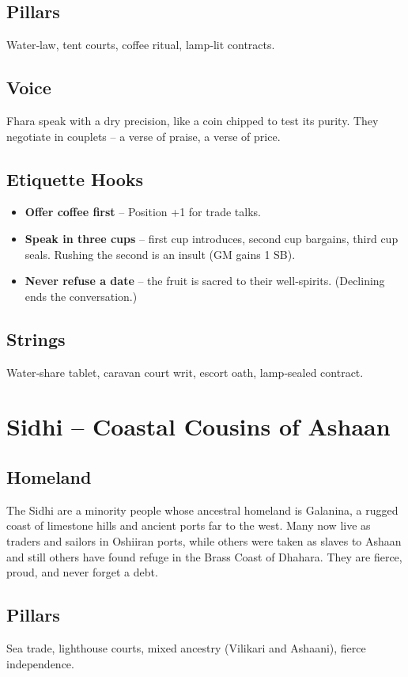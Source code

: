 \documentclass[11pt]{book}
\begin{document}
\subsection*{Pillars}
Water‑law, tent courts, coffee ritual, lamp‑lit contracts.

\subsection*{Voice}
Fhara speak with a dry precision, like a coin chipped to test its purity. They negotiate in couplets -- a verse of praise, a verse of price.

\subsection*{Etiquette Hooks}
\begin{itemize}
    \item \textbf{Offer coffee first} -- Position +1 for trade talks.
    \item \textbf{Speak in three cups} -- first cup introduces, second cup bargains, third cup seals. Rushing the second is an insult (GM gains 1 SB).
    \item \textbf{Never refuse a date} -- the fruit is sacred to their well‑spirits. (Declining ends the conversation.)
\end{itemize}

\subsection*{Strings}
Water‑share tablet, caravan court writ, escort oath, lamp‑sealed contract.

\section{Sidhi -- Coastal Cousins of Ashaan}
\subsection*{Homeland}
The Sidhi are a minority people whose ancestral homeland is Galanina, a rugged coast of limestone hills and ancient ports far to the west. Many now live as traders and sailors in Oshiiran ports, while others were taken as slaves to Ashaan and still others have found refuge in the Brass Coast of Dhahara. They are fierce, proud, and never forget a debt.

\subsection*{Pillars}
Sea trade, lighthouse courts, mixed ancestry (Vilikari and Ashaani), fierce independence.
\end{document}
